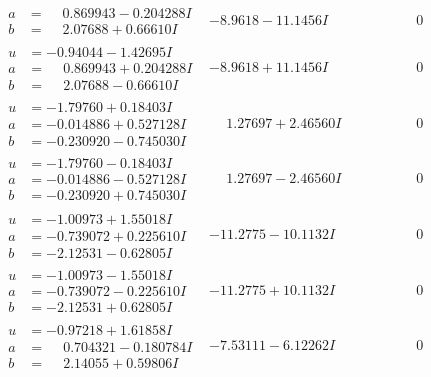 \documentclass[1p]{elsarticle_modified}
\theoremstyle{definition}
\begin{document}
$$\begin{array}{c|c|c}
\begin{aligned}
a &= \phantom{-}0.869943 - 0.204288 I \\
b &= \phantom{-}2.07688 + 0.66610 I\end{aligned}
 & -8.9618 - 11.1456 I & \phantom{-0.000000 } 0 \\ \hline\begin{aligned}
u &= -0.94044 - 1.42695 I \\
a &= \phantom{-}0.869943 + 0.204288 I \\
b &= \phantom{-}2.07688 - 0.66610 I\end{aligned}
 & -8.9618 + 11.1456 I & \phantom{-0.000000 } 0 \\ \hline\begin{aligned}
u &= -1.79760 + 0.18403 I \\
a &= -0.014886 + 0.527128 I \\
b &= -0.230920 - 0.745030 I\end{aligned}
 & \phantom{-}1.27697 + 2.46560 I & \phantom{-0.000000 } 0 \\ \hline\begin{aligned}
u &= -1.79760 - 0.18403 I \\
a &= -0.014886 - 0.527128 I \\
b &= -0.230920 + 0.745030 I\end{aligned}
 & \phantom{-}1.27697 - 2.46560 I & \phantom{-0.000000 } 0 \\ \hline\begin{aligned}
u &= -1.00973 + 1.55018 I \\
a &= -0.739072 + 0.225610 I \\
b &= -2.12531 - 0.62805 I\end{aligned}
 & -11.2775 - 10.1132 I & \phantom{-0.000000 } 0 \\ \hline\begin{aligned}
u &= -1.00973 - 1.55018 I \\
a &= -0.739072 - 0.225610 I \\
b &= -2.12531 + 0.62805 I\end{aligned}
 & -11.2775 + 10.1132 I & \phantom{-0.000000 } 0 \\ \hline\begin{aligned}
u &= -0.97218 + 1.61858 I \\
a &= \phantom{-}0.704321 - 0.180784 I \\
b &= \phantom{-}2.14055 + 0.59806 I\end{aligned}
 & -7.53111 - 6.12262 I & \phantom{-0.000000 } 0 \\ \hline\begin{aligned}

\end{aligned}
\end{array}$$
\end{document}
